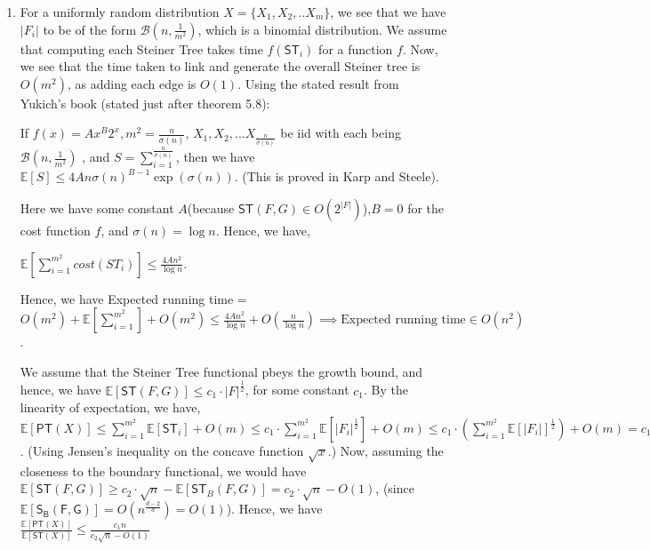 \documentclass{article}
\newcommand{\cc}[1]{\mathsf{#1}}
\begin{document}
\begin{enumerate}
\begin{enumerate}
\begin{enumerate}
				$PT = (\sum\limits_{i=1}^{m^2} cost(\cc{ST}_i)) + O(m)$
			\end{enumerate}
		\item For a uniformly random distribution $X = \{X_1,X_2,..X_m\}$, we see that we have $|F_i|$ to be of the form $\mathcal{B}(n,\frac{1}{m^2})$, which is a binomial distribution. We assume that computing each Steiner Tree takes time $f(\cc{ST}_i)$ for a function $f$. Now, we see that the time taken to link and generate the overall Steiner tree is $O(m^2)$, as adding each edge is $O(1)$. Using the stated result from Yukich's book (stated just after theorem 5.8):
		
		If $f(x) = Ax^B2^x, m^2 = \frac{n}{\sigma(n)}$, $X_1,X_2,...X_{\frac{n}{\sigma(n)}}$ be iid with each being $\mathcal{B}(n,\frac{1}{m^2})$ , and $S = \sum\limits_{i=1}^{\frac{n}{\sigma(n)}}$, then we have $\mathbb{E}[S] \leq 4An{\sigma(n)}^{B-1}\exp(\sigma(n))$. (This is proved in Karp and Steele).
		
		Here we have some constant $A$(because $\cc{ST}(F,G) \in O(2^{|F|})$),$B = 0$ for the cost function $f$, and $\sigma(n) = \log n$. Hence, we have,
		
		$\mathbb{E}[\sum\limits_{i=1}^{m^2}cost(ST_i)] \leq \frac{4An^2}{\log n}$.
		
		Hence, we have Expected running time = $ O(m^2) + \mathbb{E}[\sum\limits_{i=1}^{m^2}] + O(m^2) \leq \frac{4An^2}{\log n} + O(\frac{n}{\log n}) \implies \text{Expected running time} \in O(n^2)$.
		
		We assume that the Steiner Tree functional pbeys the growth bound, and hence, we have $\mathbb{E}[\cc{ST}(F,G)] \leq c_1\cdot {|F|}^{\frac{1}{2}}$, for some constant $c_1$. By the linearity of expectation, we have, $\mathbb{E}[\cc{PT}(X)] \leq \sum\limits_{i=1}^{m^2}\mathbb{E}[\cc{ST}_i] + O(m) \leq c_1\cdot\sum\limits_{i=1}^{m^2}\mathbb{E}[|F_i|^{\frac{1}{2}}] + O(m) \leq c_1\cdot(\sum\limits_{i=1}^{m^2}\mathbb{E}[|F_i|]^{\frac{1}{2}})+ O(m) = c_1\cdot m\cdot \sqrt{n} + O(m) = \frac{c_1n}{\sqrt{\log n}} + \frac{\sqrt{n}}{\sqrt{\log n}} \in O(n)$. (Using Jensen's inequality on the concave function $\sqrt{x}$.)
		Now, assuming the closeness to the boundary functional, we would have $\mathbb{E}[\cc{ST}(F,G)] \geq c_2\cdot \sqrt{n} - \mathbb{E}[\cc{ST}_B(F,G)] = c_2\cdot\sqrt{n} - O(1)$, (since $\mathbb{E}[\cc{S_B(F,G)}]= O(n^{\frac{d-2}{d}}) = O(1)$). Hence, we have $\frac{\mathbb{E}[\cc{PT}(X)]}{\mathbb{E}[\cc{ST}(X)]} \leq \frac{c_1n}{c_2\sqrt{n}-O(1)}$
	

\end{enumerate}
\end{enumerate}
\end{document}
